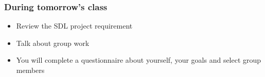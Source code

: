 \begin{frame}\frametitle{During tomorrow's class}
	\begin{itemize}
		\item	Review the SDL project requirement
		\item	Talk about group work
		\item	You will complete a questionnaire about yourself, your goals and select group members
	\end{itemize}
\end{frame}


% 
% 
